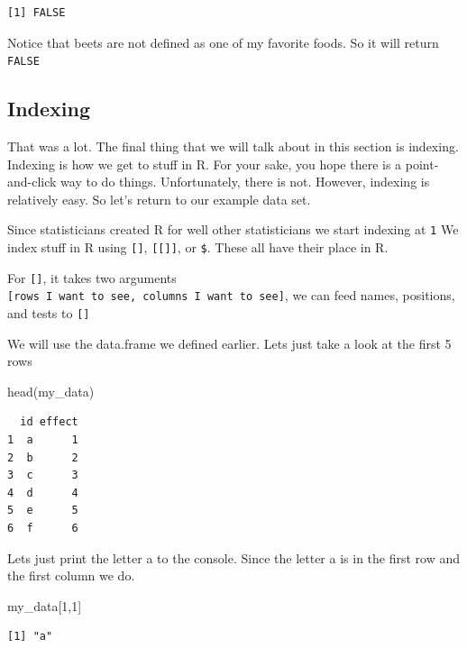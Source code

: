 \documentclass[
  letterpaper,
  DIV=11,
  numbers=noendperiod,
  oneside]{scrreprt}
\newenvironment{Shaded}{\begin{snugshade}}{\end{snugshade}}
\newcommand{\DecValTok}[1]{\textcolor[rgb]{0.68,0.00,0.00}{#1}}
\newcommand{\FunctionTok}[1]{\textcolor[rgb]{0.28,0.35,0.67}{#1}}
\newcommand{\NormalTok}[1]{\textcolor[rgb]{0.00,0.23,0.31}{#1}}
\begin{document}
\begin{verbatim}
[1] FALSE
\end{verbatim}

Notice that beets are not defined as one of my favorite foods. So it
will return \texttt{FALSE}

\hypertarget{indexing}{%
\subsection{Indexing}\label{indexing}}

That was a lot. The final thing that we will talk about in this section
is indexing. Indexing is how we get to stuff in R. For your sake, you
hope there is a point-and-click way to do things. Unfortunately, there
is not. However, indexing is relatively easy. So let's return to our
example data set.

Since statisticians created R for well other statisticians we start
indexing at \texttt{1} We index stuff in R using \texttt{{[}{]}},
\texttt{{[}{[}{]}{]}}, or \texttt{\$}. These all have their place in R.

For \texttt{{[}{]}}, it takes two arguments
\texttt{{[}rows\ I\ want\ to\ see,\ columns\ I\ want\ to\ see{]}}, we
can feed names, positions, and tests to \texttt{{[}{]}}

We will use the data.frame we defined earlier. Lets just take a look at
the first 5 rows

\begin{Shaded}
\begin{Highlighting}[]
\FunctionTok{head}\NormalTok{(my\_data)}
\end{Highlighting}
\end{Shaded}

\begin{verbatim}
  id effect
1  a      1
2  b      2
3  c      3
4  d      4
5  e      5
6  f      6
\end{verbatim}

Lets just print the letter a to the console. Since the letter a is in
the first row and the first column we do.

\begin{Shaded}
\begin{Highlighting}[]
\NormalTok{my\_data[}\DecValTok{1}\NormalTok{,}\DecValTok{1}\NormalTok{]}
\end{Highlighting}
\end{Shaded}

\begin{verbatim}
[1] "a"
\end{verbatim}
\end{document}
